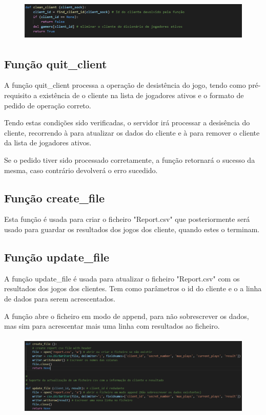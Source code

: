 \documentclass{report}
\begin{document}
\begin{figure}[!h]
\center
\includegraphics[height = 53pt]{img/cleanclient.png}
\end{figure}

\subsection{Função quit\_client}
\label{ssec:func_quit_client}

A função quit\_client processa a operação de desistência do jogo, tendo como pré-requisito a existência de o cliente na lista de jogadores ativos e o formato de pedido de operação correto.

Tendo estas condições sido verificadas, o servidor irá processar a desisência do cliente, recorrendo à  para atualizar os dados do cliente e à  para remover o cliente da lista de jogadores ativos.

Se o pedido tiver sido processado corretamente, a função retornará o sucesso da mesma, caso contrário devolverá o erro sucedido.

\subsection{Função create\_file}
\label{ssec:func_create_file}

Esta função é usada para criar o ficheiro "Report.csv" que posteriormente será usado para guardar os resultados dos jogos dos cliente, quando estes o terminam.

\subsection{Função update\_file}
\label{ssec:func_update_file}

A função update\_file é usada para atualizar o ficheiro "Report.csv" com os resultados dos jogos dos clientes. Tem como parâmetros o id do cliente e o a linha de dados para serem acrescentados.

A função abre o ficheiro em modo de append, para não sobrescrever os dados, mas sim para acrescentar mais uma linha com resultados ao ficheiro.

\begin{figure}[!h]
\center
\includegraphics[height = 110pt]{img/createupdate.png}
\end{figure}
\end{document}
